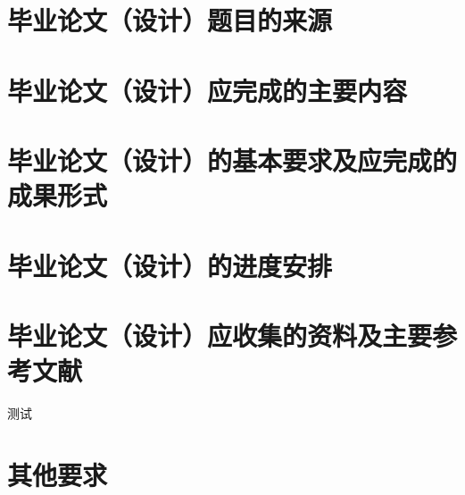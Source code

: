 
\ProposalTasks
\ProposalTasksInfomation


\section{毕业论文（设计）题目的来源}

\zhlipsum[1]


\section{毕业论文（设计）应完成的主要内容}

\zhlipsum[1]


\section{毕业论文（设计）的基本要求及应完成的成果形式}

\zhlipsum[1]


\section{毕业论文（设计）的进度安排}

\zhlipsum[1]


\section{毕业论文（设计）应收集的资料及主要参考文献}

测试 \cite{whu-bachelor:1}

\nocite{*}




\section{其他要求}
\zhlipsum[1-2]



\ProposalTasksSignature